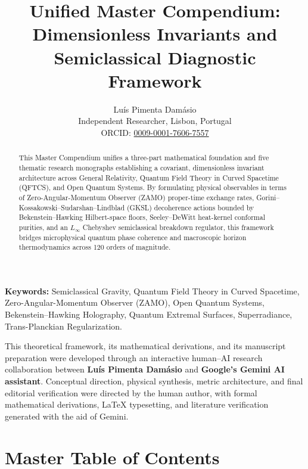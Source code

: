 \documentclass[11pt,a4paper]{article}
\title{\textbf{Unified Master Compendium: Dimensionless Invariants and Semiclassical Diagnostic Framework}}
\author{Lu\'is {Pimenta Dam\'asio} \\ \small Independent Researcher, Lisbon, Portugal \\ \small ORCID: \href{https://orcid.org/0009-0001-7606-7557}{0009-0001-7606-7557}}
\date{}
\begin{document}
\maketitle

\begin{abstract}
This Master Compendium unifies a three-part mathematical foundation and five thematic research monographs establishing a covariant, dimensionless invariant architecture across General Relativity, Quantum Field Theory in Curved Spacetime (QFTCS), and Open Quantum Systems. By formulating physical observables in terms of Zero-Angular-Momentum Observer (ZAMO) proper-time exchange rates, Gorini--Kossakowski--Sudarshan--Lindblad (GKSL) decoherence actions bounded by Bekenstein--Hawking Hilbert-space floors, Seeley--DeWitt heat-kernel conformal purities, and an $L_\infty$ Chebyshev semiclassical breakdown regulator, this framework bridges microphysical quantum phase coherence and macroscopic horizon thermodynamics across 120 orders of magnitude.
\end{abstract}

\noindent\textbf{Keywords:} Semiclassical Gravity, Quantum Field Theory in Curved Spacetime, Zero-Angular-Momentum Observer (ZAMO), Open Quantum Systems, Bekenstein--Hawking Holography, Quantum Extremal Surfaces, Superradiance, Trans-Planckian Regularization.

\vspace{0.75em}
\begin{tcolorbox}[colback=blue!4!white,colframe=blue!45!black,title=\textbf{AI Collaboration \& Authorship Transparency Statement}]
\small
This theoretical framework, its mathematical derivations, and its manuscript preparation were developed through an interactive human--AI research collaboration between \textbf{Lu\'is Pimenta Dam\'asio} and \textbf{Google's Gemini AI assistant}. Conceptual direction, physical synthesis, metric architecture, and final editorial verification were directed by the human author, with formal mathematical derivations, \LaTeX{} typesetting, and literature verification generated with the aid of Gemini.
\end{tcolorbox}

\section{Master Table of Contents}
\end{document}
